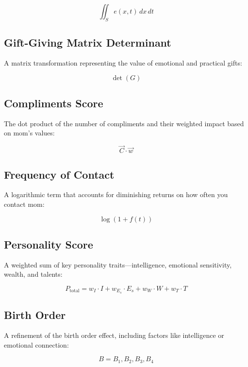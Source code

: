 \documentclass[12pt]{article}
\begin{document}
\begin{equation}
\iint_S e(x, t) \, dx \, dt
\end{equation}

\subsection{Gift-Giving Matrix Determinant}
A matrix transformation representing the value of emotional and practical gifts:

\begin{equation}
\det(G)
\end{equation}

\subsection{Compliments Score}
The dot product of the number of compliments and their weighted impact based on mom’s values:

\begin{equation}
\vec{C} \cdot \vec{w}
\end{equation}

\subsection{Frequency of Contact}
A logarithmic term that accounts for diminishing returns on how often you contact mom:

\begin{equation}
\log(1 + f(t))
\end{equation}

\subsection{Personality Score}
A weighted sum of key personality traits—intelligence, emotional sensitivity, wealth, and talents:

\begin{equation}
P_{\text{total}} = w_I \cdot I + w_{E_s} \cdot E_s + w_W \cdot W + w_T \cdot T
\end{equation}

\subsection{Birth Order}
A refinement of the birth order effect, including factors like intelligence or emotional connection:

\begin{equation}
B = B_1, B_2, B_3, B_4
\end{equation}
\end{document}
